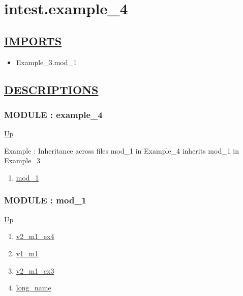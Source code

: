 \chapter*{intest.example\_4}
\hypertarget{ecldoc:toc:intest.example_4}{}

\section*{\underline{IMPORTS}}
\begin{itemize}
\item Example\_3.mod\_1
\end{itemize}

\section*{\underline{DESCRIPTIONS}}
\subsection*{MODULE : example\_4}
\hypertarget{ecldoc:intest.example_4}{}
\par
\begin{minipage}[t]{\textwidth}
\begin{flushleft}
  
\end{flushleft}
\end{minipage}
\hyperlink{ecldoc:toc:intest}{Up} \\
\par
Example : Inheritance across files mod\_1 in Example\_4 inherits mod\_1 in Example\_3 \\
\par
\begin{enumerate}
\item \hyperlink{ecldoc:intest.example_4.mod_1}{mod\_1}
\end{enumerate}
\subsection*{MODULE : mod\_1}
\hypertarget{ecldoc:intest.example_4.mod_1}{}
\par
\begin{minipage}[t]{\textwidth}
\begin{flushleft}
  
\end{flushleft}
\end{minipage}
\hyperlink{ecldoc:intest.example_4}{Up} \\
\par
\par
\begin{enumerate}
\item \hyperlink{ecldoc:intest.example_4.mod_1.v2_m1_ex4}{v2\_m1\_ex4}
\item \hyperlink{ecldoc:example_3.mod_1.v1_m1}{v1\_m1}
\item \hyperlink{ecldoc:example_3.mod_1.v2_m1_ex3}{v2\_m1\_ex3}
\item \hyperlink{ecldoc:example_3.mod_1.long_name}{long\_name}
\end{enumerate}
